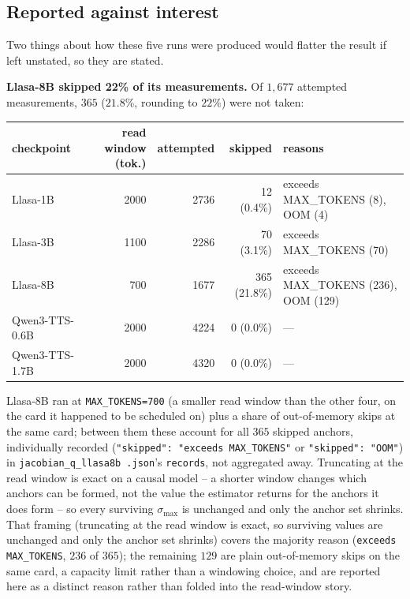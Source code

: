 \documentclass[11pt]{article}
\begin{document}
\subsection{Reported against interest}
\label{sec:s5-jacobian-flags}

Two things about how these five runs were produced would flatter the result if
left unstated, so they are stated.

\noindent\textbf{Llasa-8B skipped 22\% of its measurements.} Of $1{,}677$
attempted measurements, $365$ ($21.8\%$, rounding to $22\%$) were not taken:

\begin{center}
\begin{tabular}{@{}lrrrp{4.6cm}@{}}
\toprule
checkpoint & read window (tok.) & attempted & skipped & reasons \\
\midrule
Llasa-1B & 2000 & 2736 & 12 (0.4\%) & exceeds MAX\_TOKENS (8), OOM (4) \\
Llasa-3B & 1100 & 2286 & 70 (3.1\%) & exceeds MAX\_TOKENS (70) \\
Llasa-8B & 700 & 1677 & 365 (21.8\%) & exceeds MAX\_TOKENS (236), OOM (129) \\
Qwen3-TTS-0.6B & 2000 & 4224 & 0 (0.0\%) & --- \\
Qwen3-TTS-1.7B & 2000 & 4320 & 0 (0.0\%) & --- \\
\bottomrule
\end{tabular}
\end{center}

Llasa-8B ran at \texttt{MAX\_TOKENS=700} (a smaller read window than the other
four, on the card it happened to be scheduled on) plus a share of
out-of-memory skips at the same card; between them these account for all $365$
skipped anchors, individually recorded (\texttt{"skipped": "exceeds
MAX\_TOKENS"} or \texttt{"skipped": "OOM"}) in \texttt{jacobian\_q\_llasa8b
.json}'s \texttt{records}, not aggregated away. Truncating at the read window
is exact on a causal model -- a shorter window changes which anchors can be
formed, not the value the estimator returns for the anchors it does form -- so
every surviving $\sigma_{\max}$ is unchanged and only the anchor set shrinks.
That framing (truncating at the read window is exact, so
surviving values are unchanged and only the anchor set shrinks) covers the
majority reason (\texttt{exceeds MAX\_TOKENS}, $236$ of $365$); the remaining
$129$ are plain out-of-memory skips on the same card, a capacity limit rather
than a windowing choice, and are reported here as a distinct reason rather
than folded into the read-window story.
\end{document}
